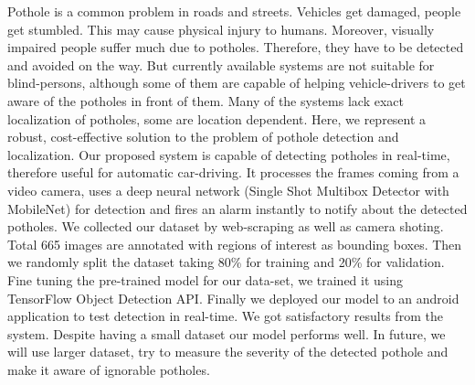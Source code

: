 Pothole is a common problem in roads and streets. Vehicles get damaged, people get stumbled. This may cause physical injury to humans. Moreover, visually impaired people suffer much due to potholes. Therefore, they have to be detected and avoided on the way. But currently available systems are not suitable for blind-persons, although some of them are capable of helping vehicle-drivers to get aware of the potholes in front of them. Many of the systems lack exact localization of potholes, some are location dependent. Here, we represent a robust, cost-effective solution to the problem of pothole detection and localization. Our proposed system is capable of detecting potholes in real-time, therefore useful for automatic car-driving. It processes the frames coming from a  video camera, uses a deep neural network (Single Shot Multibox Detector with MobileNet) for detection and fires an alarm instantly to notify about the detected potholes. We collected our dataset by web-scraping as well as camera shoting. Total 665 images are annotated with regions of interest as bounding boxes. Then we randomly split the dataset taking 80\% for training and 20\% for validation. Fine tuning the pre-trained model for our data-set, we trained it using TensorFlow Object Detection API. Finally we deployed our model to an android application to test detection in real-time. We got satisfactory results from the system. Despite having a small dataset our model performs well. In future, we will use larger dataset, try to measure the severity of the detected pothole and make it aware of ignorable potholes.
